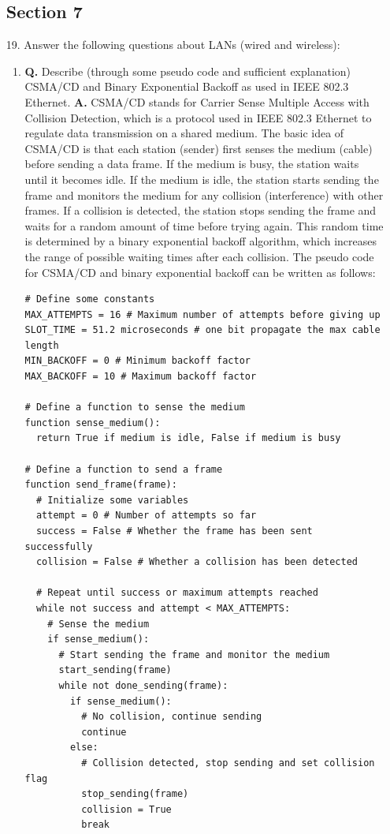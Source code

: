 \documentclass[main.tex]{subfiles}
\begin{document}
\begin{enumerate}

\subsection*{Section 7}
	
\item[19.] Answer the following questions about LANs (wired and wireless):

    \begin{enumerate}
        \item \textbf{Q.} Describe (through some pseudo code and sufficient explanation) CSMA/CD and Binary Exponential Backoff as used in IEEE 802.3 Ethernet. \textbf{A.} CSMA/CD stands for Carrier Sense Multiple Access with Collision Detection, which is a protocol used in IEEE 802.3 Ethernet to regulate data transmission on a shared medium. The basic idea of CSMA/CD is that each station (sender) first senses the medium (cable) before sending a data frame. If the medium is busy, the station waits until it becomes idle. If the medium is idle, the station starts sending the frame and monitors the medium for any collision (interference) with other frames. If a collision is detected, the station stops sending the frame and waits for a random amount of time before trying again. This random time is determined by a binary exponential backoff algorithm, which increases the range of possible waiting times after each collision. The pseudo code for CSMA/CD and binary exponential backoff can be written as follows:

\begin{verbatim}
# Define some constants
MAX_ATTEMPTS = 16 # Maximum number of attempts before giving up
SLOT_TIME = 51.2 microseconds # one bit propagate the max cable length
MIN_BACKOFF = 0 # Minimum backoff factor
MAX_BACKOFF = 10 # Maximum backoff factor

# Define a function to sense the medium
function sense_medium():
  return True if medium is idle, False if medium is busy

# Define a function to send a frame
function send_frame(frame):
  # Initialize some variables
  attempt = 0 # Number of attempts so far
  success = False # Whether the frame has been sent successfully
  collision = False # Whether a collision has been detected

  # Repeat until success or maximum attempts reached
  while not success and attempt < MAX_ATTEMPTS:
    # Sense the medium
    if sense_medium():
      # Start sending the frame and monitor the medium
      start_sending(frame)
      while not done_sending(frame):
        if sense_medium():
          # No collision, continue sending
          continue
        else:
          # Collision detected, stop sending and set collision flag
          stop_sending(frame)
          collision = True
          break
      

\end{verbatim}
\end{enumerate}
\end{enumerate}
\end{document}
